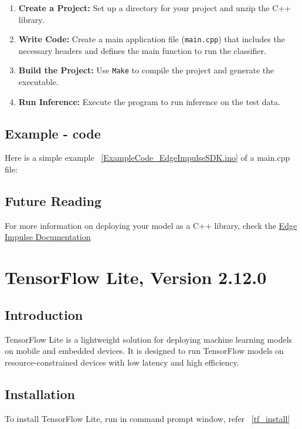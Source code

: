 \begin{enumerate}
	\item \textbf{Create a Project:} Set up a directory for your project and unzip the C++ library.
	
	\item \textbf{Write Code:} Create a main application file (\texttt{main.cpp}) that includes the necessary headers and defines the main function to run the classifier.
	
	\item \textbf{Build the Project:} Use \texttt{Make} to compile the project and generate the executable.
	
	\item \textbf{Run Inference:} Execute the program to run inference on the test data.
\end{enumerate}

\subsection{Example - code}
Here is a simple example ~\ref{ExampleCode_EdgeImpulseSDK.ino} of a main.cpp file:


{
	\label{ExampleCode_EdgeImpulseSDK.ino}
}


\subsection{Future Reading}
For more information on deploying your model as a C++ library, check the \href{https://docs.edgeimpulse.com/docs/run-inference/cpp-library/deploy-your-model-as-a-c-library}{Edge Impulse Documentation}

\newpage
\section{TensorFlow Lite, Version 2.12.0}
\subsection{Introduction}
TensorFlow Lite is a lightweight solution for deploying machine learning models on mobile and embedded devices. It is designed to run TensorFlow models on resource-constrained devices with low latency and high efficiency. \cite{tensorflowLiteGuide:2024}


\subsection{Installation}
To install TensorFlow Lite, run  in command prompt window, refer ~\ref{tf_install}

